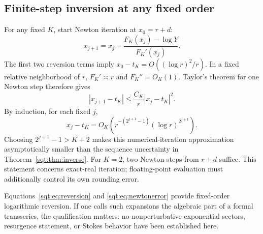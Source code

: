 \subsection{Finite-step inversion at any fixed order}
For any fixed $K$, start Newton iteration at $x_0=r+d$:
\begin{equation}\label{sqt:eq:newton}
x_{j+1}=x_j-\frac{F_K(x_j)-\log Y}{F_K'(x_j)}.
\end{equation}
The first two reversion terms imply $x_0-t_K=O((\log r)^2/r)$. In a fixed relative neighborhood of $r$, $F_K'\asymp r$ and $F_K''=O_K(1)$. Taylor's theorem for one Newton step therefore gives
\[
|x_{j+1}-t_K|\leq\frac{C_K}{r}|x_j-t_K|^2.
\]
By induction, for each fixed $j$,
\begin{equation}\label{sqt:eq:newtonerror}
x_j-t_K=O_K\left(
 r^{-(2^{j+1}-1)}(\log r)^{2^{j+1}}\right).
\end{equation}
Choosing $2^{j+1}-1>K+2$ makes this numerical-iteration approximation asymptotically smaller than the sequence uncertainty in Theorem~\ref{sqt:thm:inverse}. For $K=2$, two Newton steps from $r+d$ suffice. This statement concerns exact-real iteration; floating-point evaluation must additionally control its own rounding error.

Equations~\eqref{sqt:eq:reversion} and \eqref{sqt:eq:newtonerror} provide fixed-order logarithmic reversion. If one calls such expansions the algebraic part of a formal transseries, the qualification matters: no nonperturbative exponential sectors, resurgence statement, or Stokes behavior have been established here.

